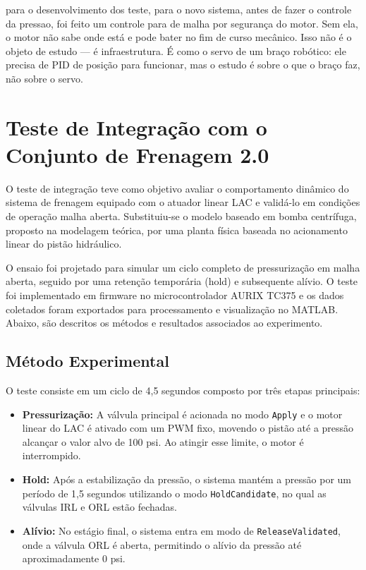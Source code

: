 para o desenvolvimento dos teste, para o novo sistema, antes de fazer o controle da pressao, foi feito um controle para de malha por segurança do motor. Sem ela, o motor não sabe onde está e pode bater no fim de curso mecânico. Isso não é o objeto de estudo — é infraestrutura. É como o servo de um braço robótico: ele precisa de PID de posição para funcionar, mas o estudo é sobre o que o braço faz, não sobre o servo.

\section{Teste de Integração com o Conjunto de Frenagem 2.0}

O teste de integração teve como objetivo avaliar o comportamento dinâmico do sistema de frenagem equipado com o atuador linear LAC e validá-lo em condições de operação malha aberta. Substituiu-se o modelo baseado em bomba centrífuga, proposto na modelagem teórica, por uma planta física baseada no acionamento linear do pistão hidráulico.

O ensaio foi projetado para simular um ciclo completo de pressurização em malha aberta, seguido por uma retenção temporária (hold) e subsequente alívio. O teste foi implementado em firmware no microcontrolador AURIX TC375 e os dados coletados foram exportados para processamento e visualização no MATLAB. Abaixo, são descritos os métodos e resultados associados ao experimento.

\subsection{Método Experimental}

O teste consiste em um ciclo de 4,5 segundos composto por três etapas principais:
\begin{itemize}
    \item \textbf{Pressurização:} A válvula principal é acionada no modo \texttt{Apply} e o motor linear do LAC é ativado com um PWM fixo, movendo o pistão até a pressão alcançar o valor alvo de 100 psi. Ao atingir esse limite, o motor é interrompido.
    \item \textbf{Hold:} Após a estabilização da pressão, o sistema mantém a pressão por um período de 1,5 segundos utilizando o modo \texttt{HoldCandidate}, no qual as válvulas IRL e ORL estão fechadas.
    \item \textbf{Alívio:} No estágio final, o sistema entra em modo de \texttt{ReleaseValidated}, onde a válvula ORL é aberta, permitindo o alívio da pressão até aproximadamente 0 psi.
\end{itemize}


